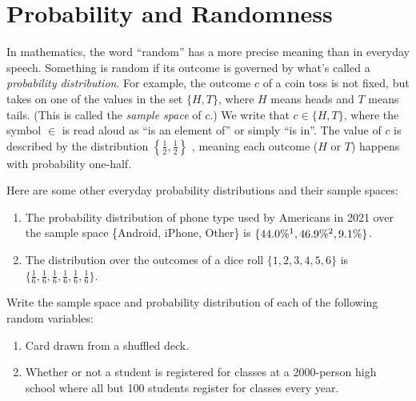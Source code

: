 \section{Probability and Randomness}\label{sec:prob}

In mathematics, the word ``random'' has a more precise meaning than in everyday 
speech. Something is random if its outcome is governed by what's called a 
\emph{probability distribution}. 
For example, the outcome $c$ of a coin toss is not fixed, but takes 
on one of the values in the set $\{H, T\}$, where $H$ means heads and $T$ means 
tails. (This is called the \emph{sample space} of $c$.) We write 
that $c \in \{H,T\}$, where the symbol $\in$ is read aloud as 
``is an element of'' or simply ``is in''.
The value of $c$ is described by the distribution $\left\{\frac{1}{2}, 
\frac{1}{2}\right\}$ , meaning each outcome ($H$ or $T$) happens with 
probability one-half.

\begin{example}\label{ex:prob-dist}
    Here are some other everyday probability distributions and their 
    sample spaces:
    \renewcommand{\labelenumi}{(\alph{enumi})} 
    \begin{enumerate}
        \item The probability distribution of phone type used by Americans 
        in 2021 over the sample space \{Android, iPhone, Other\} is $\{44.0\%\footnotemark[1],
        46.9\%\footnotemark[2],9.1\%\}$.
        \item The distribution over the outcomes of a dice roll $\{1,2,3,4,5,6\}$
        is $\{\frac{1}{6},\frac{1}{6},\frac{1}{6},\frac{1}{6},\frac{1}{6},\frac{1}{6}\}$.
    \end{enumerate}
\end{example}

\begin{exercise}
    Write the sample space and probability distribution of each of 
    the following random variables:
    \renewcommand{\labelenumi}{(\alph{enumi})} 
    \begin{enumerate}
        \item Card drawn from a shuffled deck.
        \item Whether or not a student is registered for classes at a 2000-person high school 
        where all but 100 students register for classes every year.
    \end{enumerate}
\end{exercise}

